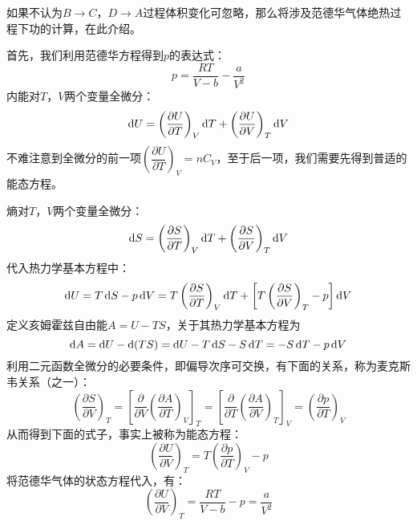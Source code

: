 \begin{solution}
{			如果不认为$B\rightarrow C$，$D\rightarrow A$过程体积变化可忽略，那么将涉及范德华气体绝热过程下功的计算，在此介绍。
			
			首先，我们利用范德华方程得到$p$的表达式：
			\begin{equation*}
				p = \frac{RT}{V - b} - \frac{a}{V^2}
			\end{equation*}
			内能对$T$，$V$两个变量全微分：
			\begin{equation*}
				\dif U = \left(\frac{\partial U}{\partial T}\right)_{V} \dif T + \left(\frac{\partial U}{\partial V}\right)_{T} \dif V
			\end{equation*}
			不难注意到全微分的前一项$\left(\dfrac{\partial U}{\partial T}\right)_{V} = nC_{V}$，至于后一项，我们需要先得到普适的能态方程。
			
			熵对$T$，$V$两个变量全微分：
			\begin{equation*}
				\dif S = \left(\frac{\partial S}{\partial T}\right)_{V} \dif T + \left(\frac{\partial S}{\partial V}\right)_{T} \dif V
			\end{equation*}
			代入热力学基本方程中：
			\begin{equation*}
				\dif U = T\dif S - p \dif V 
				= T\left(\frac{\partial S}{\partial T}\right)_{V} \dif T + \left[T\left(\frac{\partial S}{\partial V}\right)_{T} - p\right] \dif V
			\end{equation*}
			定义亥姆霍兹自由能$A=U-TS$，关于其热力学基本方程为            
			\begin{equation*}
				\dif{A} = \dif U - \dif (TS) = \dif U - T \dif S - S \dif T = -S\dif{T} - p\dif{V}
			\end{equation*}
			利用二元函数全微分的必要条件，即偏导次序可交换，有下面的关系，称为麦克斯韦关系（之一）：
			\begin{equation*}
				\left(\frac{\partial S}{\partial V}\right)_{T} 
				=\left[\frac{\partial}{\partial V}\left(\frac{\partial A}{\partial T}\right)_V \right]_T 
				=\left[\frac{\partial}{\partial T}\left(\frac{\partial A}{\partial V}\right)_T \right]_V 
				=\left(\frac{\partial p}{\partial T}\right)_{V}
			\end{equation*}
			从而得到下面的式子，事实上被称为能态方程：
			\begin{equation*}
				\left(\frac{\partial U}{\partial V}\right)_{T} = T\left(\frac{\partial p}{\partial T}\right)_{V} - p
			\end{equation*}
			将范德华气体的状态方程代入，有：
			\begin{equation*}
				\left(\frac{\partial U}{\partial V}\right)_{T} = \frac{RT}{V-b} - p = \frac{a}{V^{2}}

\end{equation*}}
\end{solution}
